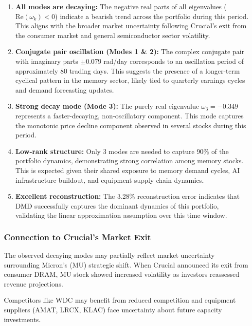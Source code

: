 \documentclass[12pt,a4paper]{article}
\begin{document}
\begin{enumerate}
    \item \textbf{All modes are decaying:} The negative real parts of all eigenvalues ($\text{Re}(\omega_k) < 0$) indicate a bearish trend across the portfolio during this period. This aligns with the broader market uncertainty following Crucial's exit from the consumer market and general semiconductor sector volatility.
    
    \item \textbf{Conjugate pair oscillation (Modes 1 \& 2):} The complex conjugate pair with imaginary parts $\pm 0.079$ rad/day corresponds to an oscillation period of approximately 80 trading days. This suggests the presence of a longer-term cyclical pattern in the memory sector, likely tied to quarterly earnings cycles and demand forecasting updates.
    
    \item \textbf{Strong decay mode (Mode 3):} The purely real eigenvalue $\omega_3 = -0.349$ represents a faster-decaying, non-oscillatory component. This mode captures the monotonic price decline component observed in several stocks during this period.
    
    \item \textbf{Low-rank structure:} Only 3 modes are needed to capture 90\% of the portfolio dynamics, demonstrating strong correlation among memory stocks. This is expected given their shared exposure to memory demand cycles, AI infrastructure buildout, and equipment supply chain dynamics.
    
    \item \textbf{Excellent reconstruction:} The 3.28\% reconstruction error indicates that DMD successfully captures the dominant dynamics of this portfolio, validating the linear approximation assumption over this time window.
\end{enumerate}

\subsubsection{Connection to Crucial's Market Exit}

The observed decaying modes may partially reflect market uncertainty surrounding Micron's (MU) strategic shift. When Crucial announced its exit from consumer DRAM, MU stock showed increased volatility as investors reassessed revenue projections.

Competitors like WDC may benefit from reduced competition and equipment suppliers (AMAT, LRCX, KLAC) face uncertainty about future capacity investments.
\end{document}
